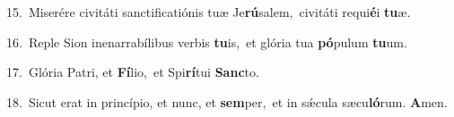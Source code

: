 {\numbfont\textcolor{\numbcolor}{15.}}~Miserére civitáti sanctificatiónis tuæ Je\-\textbf{rú}\-salem,~\star civitáti requi\-\textbf{é}\-i \textbf{tu}\-æ.\par
{\numbfont\textcolor{\numbcolor}{16.}}~Reple Sion inenarrabílibus verbis \textbf{tu}\-is,~\star et glória tua \textbf{pó}\-pulum \textbf{tu}\-um.\par
{\numbfont\textcolor{\numbcolor}{17.}}~Glória Patri, et \textbf{Fí}\-lio,~\star et Spi\-\textbf{rí}\-tui \textbf{Sanc}\-to.\par
{\numbfont\textcolor{\numbcolor}{18.}}~Sicut erat in princípio, et nunc, et \textbf{sem}\-per,~\star et in sǽcula sæcu\-\textbf{ló}\-rum. \textbf{A}\-men.\par
